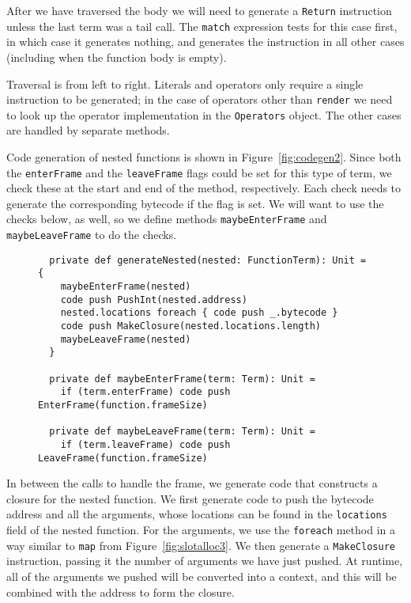 After we have traversed the body
we will need to generate a \verb!Return! instruction
unless the last term was a tail call.
The \verb!match! expression tests for this case first,
in which case it generates nothing,
and generates the instruction in all other cases
(including when the function body is empty).

Traversal is from left to right.
Literals and operators only require a single instruction to be generated;
in the case of operators other than \verb!render!
we need to look up the operator implementation
in the \verb!Operators! object.
The other cases are handled by separate methods.

Code generation of nested functions is shown in Figure~\ref{fig:codegen2}.
Since both the \verb!enterFrame! and the \verb!leaveFrame! flags
could be set for this type of term,
we check these at the start and end of the method, respectively.
Each check needs to generate the corresponding bytecode if the flag is set.
We will want to use the checks below, as well,
so we define methods \verb!maybeEnterFrame! and \verb!maybeLeaveFrame!
to do the checks.

\begin{figure}
\begin{verbatim}
  private def generateNested(nested: FunctionTerm): Unit = {
    maybeEnterFrame(nested)
    code push PushInt(nested.address)
    nested.locations foreach { code push _.bytecode }
    code push MakeClosure(nested.locations.length)
    maybeLeaveFrame(nested)
  }

  private def maybeEnterFrame(term: Term): Unit =
    if (term.enterFrame) code push EnterFrame(function.frameSize)

  private def maybeLeaveFrame(term: Term): Unit =
    if (term.leaveFrame) code push LeaveFrame(function.frameSize)
\end{verbatim}
\getcaption
\end{figure}

In between the calls to handle the frame,
we generate code that constructs a closure for the nested function.
We first generate code to push the bytecode address and all the arguments,
whose locations can be found in the \verb!locations! field
of the nested function.
For the arguments,
we use the \verb!foreach! method
in a way similar to \verb!map! from Figure~\ref{fig:slotalloc3}.
We then generate a \verb!MakeClosure! instruction,
passing it the number of arguments we have just pushed.
At runtime, all of the arguments we pushed will be converted into a context,
and this will be combined with the address to form the closure.

